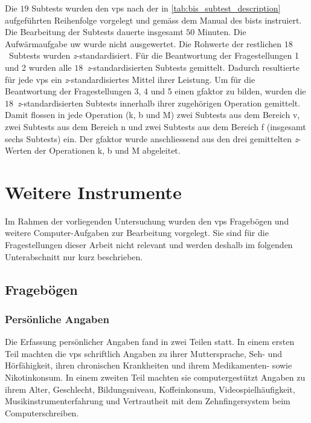\documentclass[11pt, twoside, a4paper]{book}		%
\begin{document}
Die $19$ Subtests wurden den \glspl{vp} nach der in \autoref{tab:bis_subtest_description} aufgeführten Reihenfolge vorgelegt und gemäss dem Manual des \gls{bist}s instruiert. 
Die Bearbeitung der Subtests dauerte insgesamt $50$ Minuten.
Die Aufwärmaufgabe \gls{uw} wurde nicht ausgewertet. Die Rohwerte der restlichen $18$~Subtests wurden \textit{z}-standardisiert. 
Für die Beantwortung der Fragestellungen 1 und 2 wurden alle $18$~\textit{z}-standardisierten Subtests gemittelt. Dadurch resultierte für jede \glspl{vp} ein \textit{z}-standardisiertes Mittel ihrer Leistung. 
Um für die Beantwortung der Fragestellungen 3, 4 und 5 einen \gls{gfaktor} zu bilden, wurden die $18$~\textit{z}-standardisierten Subtests innerhalb ihrer zugehörigen Operation gemittelt. Damit flossen in jede Operation (\gls{k}, \gls{b} und \gls{M}) zwei Subtests aus dem Bereich \gls{v}, zwei Subtests aus dem Bereich \gls{n} und zwei Subtests aus dem Bereich \gls{f} (insgesamt sechs Subtests) ein. Der \gls{gfaktor} wurde anschliessend aus den drei gemittelten \textit{z}-Werten der Operationen \gls{k}, \gls{b} und \gls{M} abgeleitet.

\section{Weitere Instrumente}

Im Rahmen der vorliegenden Untersuchung wurden den \glspl{vp} Fragebögen und weitere Com\-put\-er-Auf\-gaben zur Bearbeitung vorgelegt. Sie sind für die Fragestellungen dieser Arbeit nicht relevant und werden deshalb im folgenden Unterabschnitt nur kurz beschrieben.

\subsection{Fragebögen}

\subsubsection*{Persönliche Angaben}
Die Erfassung persönlicher Angaben fand in zwei Teilen statt. In einem ersten Teil machten die \glspl{vp} schriftlich Angaben zu ihrer Muttersprache, Seh- und Hörfähigkeit, ihren chronischen Krankheiten und ihrem Medikamenten- sowie Nikotinkonsum. In einem zweiten Teil machten sie computergestützt Angaben zu ihrem Alter, Geschlecht, Bildungsniveau, Koffeinkonsum,  Videospielhäufigkeit, Musikinstrumenterfahrung und Vertrautheit mit dem Zehnfingersystem beim Computerschreiben.
\end{document}
